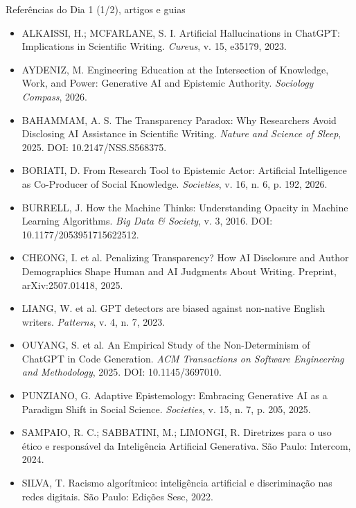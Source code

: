 \documentclass[11pt,aspectratio=169,t]{beamer}
\begin{document}
\begin{frame}{Referências do Dia 1 (1/2), artigos e guias}
  \tiny
  \begin{itemize}
    \item ALKAISSI, H.; MCFARLANE, S. I. Artificial Hallucinations in ChatGPT: Implications in Scientific Writing. \textit{Cureus}, v. 15, e35179, 2023.
    \item AYDENIZ, M. Engineering Education at the Intersection of Knowledge, Work, and Power: Generative AI and Epistemic Authority. \textit{Sociology Compass}, 2026.
    \item BAHAMMAM, A. S. The Transparency Paradox: Why Researchers Avoid Disclosing AI Assistance in Scientific Writing. \textit{Nature and Science of Sleep}, 2025. DOI: 10.2147/NSS.S568375.
    \item BORIATI, D. From Research Tool to Epistemic Actor: Artificial Intelligence as Co-Producer of Social Knowledge. \textit{Societies}, v. 16, n. 6, p. 192, 2026.
    \item BURRELL, J. How the Machine Thinks: Understanding Opacity in Machine Learning Algorithms. \textit{Big Data \& Society}, v. 3, 2016. DOI: 10.1177/2053951715622512.
    \item CHEONG, I. et al. Penalizing Transparency? How AI Disclosure and Author Demographics Shape Human and AI Judgments About Writing. Preprint, arXiv:2507.01418, 2025.
    \item LIANG, W. et al. GPT detectors are biased against non-native English writers. \textit{Patterns}, v. 4, n. 7, 2023.
    \item OUYANG, S. et al. An Empirical Study of the Non-Determinism of ChatGPT in Code Generation. \textit{ACM Transactions on Software Engineering and Methodology}, 2025. DOI: 10.1145/3697010.
    \item PUNZIANO, G. Adaptive Epistemology: Embracing Generative AI as a Paradigm Shift in Social Science. \textit{Societies}, v. 15, n. 7, p. 205, 2025.
    \item SAMPAIO, R. C.; SABBATINI, M.; LIMONGI, R. Diretrizes para o uso ético e responsável da Inteligência Artificial Generativa. São Paulo: Intercom, 2024.
    \item SILVA, T. Racismo algorítmico: inteligência artificial e discriminação nas redes digitais. São Paulo: Edições Sesc, 2022.
  \end{itemize}
\end{frame}
\end{document}
